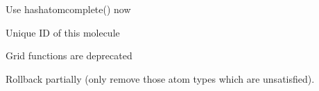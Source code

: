 \begin{DoxyRefList}
%
Use hashatomcomplete() now  
\item[Member \mbox{\hyperlink{classMolecule_a87674f540b98a33b4921c4d57b3982fc}{Molecule\+::ID}} ]\label{deprecated__deprecated000041}%
%
Unique ID of this molecule  
\item[Member \mbox{\hyperlink{classMolecule_a1b92bf02eb26dd75ea36273601e0a3c2}{Molecule\+::load\+Grid}} (\mbox{\hyperlink{classSystem}{System}} \&s)]\label{deprecated__deprecated000043}%
%
Grid functions are deprecated  
\item[Member \mbox{\hyperlink{classMolecule_ac178106e85c4a667d2c7faa57765d0fb}{Molecule\+::mini\+Rollback}} (const \mbox{\hyperlink{classForceField}{Force\+Field}} \&ff)]\label{deprecated__deprecated000045}%
%
Rollback partially (only remove those atom types which are unsatisfied). 


\end{DoxyRefList}

